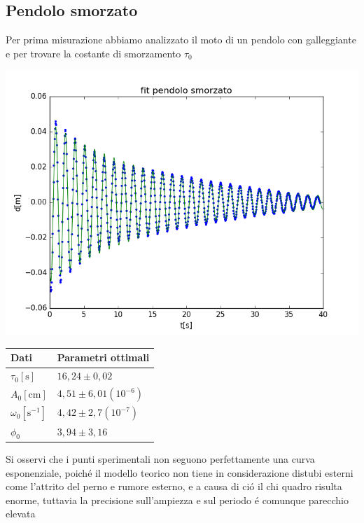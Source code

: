 \documentclass{exam}
\begin{document}
		\subsection{Pendolo smorzato}
			Per prima misurazione abbiamo analizzato il moto di un pendolo con galleggiante	e per trovare la costante di smorzamento $\tau_{0}$ \\
			\begin{minipage}{0.5\textwidth}
				\includegraphics[width=\textwidth]{fit_smorzato}
				\end{minipage}
			\begin{minipage}{0.5\textwidth}
				\begin{tabular}{ll}
					\toprule
					Dati & Parametri ottimali \\
					\midrule
					$\tau_{0}[\textrm{s}]$ & $16,24 \pm 0,02$ \\
					$A_{0}[\textrm{cm}]$ & $4,51 \pm 6,01(10^{-6})$\\
					$\omega_{0}[\textrm{s}^{-1}]$ & $4,42 \pm 2,7(10^{-7})$\\			
					$\phi_{0}$ & $3,94 \pm 3,16$\\
					\bottomrule

				\end{tabular}
			\end{minipage}
			Si osservi che i punti sperimentali non seguono perfettamente una curva esponenziale, poich\'e il modello teorico non tiene in considerazione distubi esterni come l'attrito del perno e rumore esterno, e a causa di ci\'o il chi quadro risulta enorme, tuttavia la precisione sull'ampiezza e sul periodo \'e comunque parecchio elevata
\end{document}
